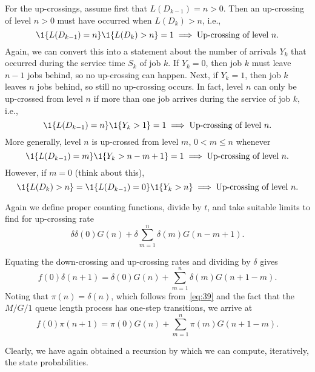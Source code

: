 For the up-crossings, assume first that $L(D_{k-1})=n>0$.  Then an up-crossing of level $n>0$  must have occurred when $L(D_k)>n$, i.e., 
 \begin{equation*}
 \1{L(D_{k-1}) = n}\1{L(D_k)>n} = 1 \implies   \text{Up-crossing of level $n$}.
 \end{equation*}
Again, we can convert this into a statement about  the number of
arrivals $Y_k$ that occurred during the service time $S_k$ of job $k$.  If $Y_k=0$, then
job $k$ must leave $n-1$ jobs behind, so no up-crossing can
happen. Next, if $Y_k=1$, then job $k$ leaves $n$ jobs behind, so
still no up-crossing occurs. In fact, level $n$ can only be  up-crossed from level $n$ if
more than one job arrives during the service of job $k$, i.e.,
\begin{equation*}
\1{L(D_{k-1})=n} \1{Y_{k}>1} = 1 \implies   \text{Up-crossing of level $n$}.
\end{equation*}
More generally, level $n$ is up-crossed from level $m$, $0<m\leq n$ whenever
\begin{equation*}
\1{L(D_{k-1})=m} \1{Y_{k}>n-m+1} = 1 \implies   \text{Up-crossing of level $n$}.
\end{equation*}
However,  if $m=0$ (think about this),
\begin{equation*}
\1{L(D_{k})>n} = \1{L(D_{k-1})=0} \1{Y_{k}>n}   \implies   \text{Up-crossing of level $n$}.
\end{equation*}

Again we define proper counting functions,  divide by $t$, and take suitable limits to find for up-crossing rate
\begin{equation}\label{eq:555}
\delta \delta(0) G(n) + \delta \sum_{m=1}^n \delta(m) G(n-m+1).
\end{equation}


Equating the down-crossing and up-crossing rates and dividing
by $\delta$ gives
\begin{equation*}
  f(0) \delta(n+1) = \delta(0) G(n) + \sum_{m=1}^{n} \delta(m) G(n+1-m).
\end{equation*}
Noting that $\pi(n) = \delta(n)$, which follows from~\cref{eq:39} and the fact that the $M/G/1$ queue length process has one-step transitions, we arrive at
\begin{equation}\label{eq:72}
  f(0) \pi(n+1) = \pi(0) G(n) + \sum_{m=1}^{n} \pi(m) G(n+1-m).
\end{equation}

Clearly, we have again obtained a recursion by which we can compute, iteratively, the state probabilities. 


